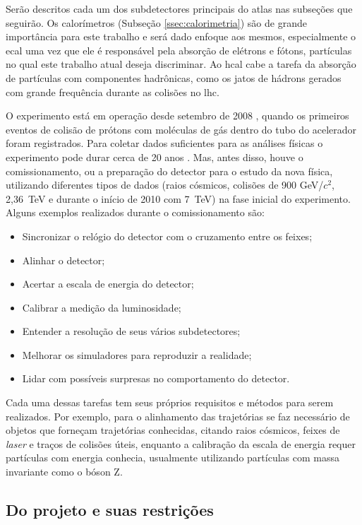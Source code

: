 Serão descritos cada um dos subdetectores principais do \gls{atlas} nas
subseções que seguirão. Os calorímetros (Subseção \ref{ssec:calorimetria}) são de grande importância 
para este trabalho e será dado enfoque aos mesmos, 
especialmente o \gls{ecal} uma vez que ele é responsável 
pela absorção de elétrons e fótons, partículas no qual este trabalho atual deseja
discriminar. Ao \gls{hcal} cabe a tarefa da absorção de partículas
com componentes hadrônicas, como os jatos de hádrons gerados com grande
frequência durante as colisões no \gls{lhc}.

O experimento está em operação desde setembro de 2008 \cite{webLHC},
quando os primeiros eventos de colisão de prótons com moléculas de gás dentro do tubo do acelerador
foram registrados. Para coletar dados suficientes para as análises físicas o
experimento pode durar cerca de 20 anos \cite{ATLAS_TDR}. Mas, antes disso, 
houve o comissionamento, ou a preparação do detector para o estudo da nova
física, utilizando diferentes tipos de dados (raios cósmicos, colisões de 900 GeV/$c^2$, 2,36~TeV 
e durante o início de 2010 com 7~TeV) na fase inicial do experimento. 
Alguns exemplos realizados durante o comissionamento são:

\begin{itemize}
\item Sincronizar o relógio do detector com o cruzamento entre os feixes;
\item Alinhar o detector;
\item Acertar a escala de energia do detector;
\item Calibrar a medição da luminosidade;
\item Entender a resolução de seus vários subdetectores;
\item Melhorar os simuladores para reproduzir a realidade;
\item Lidar com possíveis surpresas no comportamento do detector.
\end{itemize}

Cada uma dessas tarefas tem seus próprios requisitos e métodos para serem
realizados. Por exemplo, para o alinhamento das trajetórias se faz necessário de
objetos que forneçam trajetórias conhecidas, citando raios cósmicos, feixes de \emph{laser} 
e traços de colisões úteis, enquanto a calibração da
escala de energia requer partículas com energia conhecia, usualmente
utilizando partículas com massa invariante como o bóson Z.

\subsection{Do projeto e suas restrições}
\label{ssec:atlas_restr}

